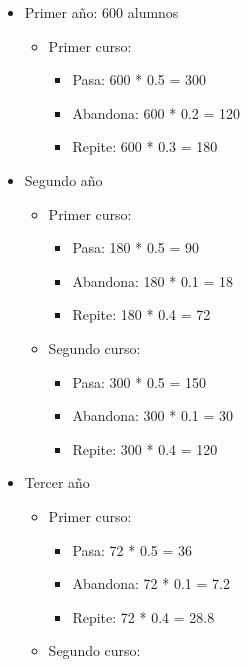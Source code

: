 \documentclass{templateNote}
\begin{document}
\begin{enumerate}
\begin{enumerate}[label=\alph*)]
        \begin{itemize}
            \item Primer año: 600 alumnos
            \begin{itemize}
                \item Primer curso: 
                \begin{itemize}
                    \item Pasa: 600 * 0.5 = 300
                    \item Abandona: 600 * 0.2 = 120
                    \item Repite: 600 * 0.3 = 180
                \end{itemize}
            \end{itemize}
            \item Segundo año
            \begin{itemize}
                \item Primer curso:
                \begin{itemize}
                    \item Pasa: 180 * 0.5 = 90
                    \item Abandona: 180 * 0.1 = 18
                    \item Repite: 180 * 0.4 = 72
                \end{itemize}
                \item Segundo curso:
                \begin{itemize}
                    \item Pasa: 300 * 0.5 = 150
                    \item Abandona: 300 * 0.1 = 30
                    \item Repite: 300 * 0.4 = 120
                \end{itemize}
            \end{itemize}
            \item Tercer año
            \begin{itemize}
                \item Primer curso:
                \begin{itemize}
                    \item Pasa: 72 * 0.5 = 36
                    \item Abandona: 72 * 0.1 = 7.2
                    \item Repite: 72 * 0.4 = 28.8
                \end{itemize}
                \item Segundo curso:

\end{itemize}
\end{itemize}
\end{enumerate}
\end{enumerate}
\end{document}
